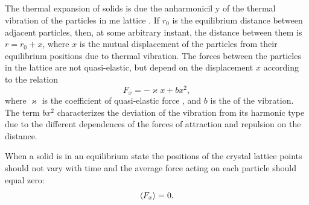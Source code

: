 \subsection{}\label{40.2.4} The thermal expansion of solids is due the anharmonicil y of the thermal vibration of the particles in me lattice . If $r_{0}$ is the equilibrium distance between adjacent particles, then, at some arbitrary instant, the distance between them is $r = r_{0} +
 x$, where $x$ is the mutual displacement of the particles from their equilibrium positions due to thermal vibration. The forces between the particles in the lattice are not quasi-elastic, but depend on the displacement $x$ according to the relation
\begin{equation*}%
F_{x} = -\varkappa x + bx^{2},
\end{equation*}
where $\varkappa$ is the coefficient of quasi-elastic force , and $b$ is the  of the vibration. The term $bx^{2}$ characterizes the deviation of the vibration from its harmonic type due to the different dependences of the forces of attraction and repulsion on the distance.

When a solid is in an equilibrium state the positions of the crystal lattice points should not vary with time and the average force acting on each particle should equal zero:
\begin{equation*}%
\expval{F_{x}} = 0.
\end{equation*}


